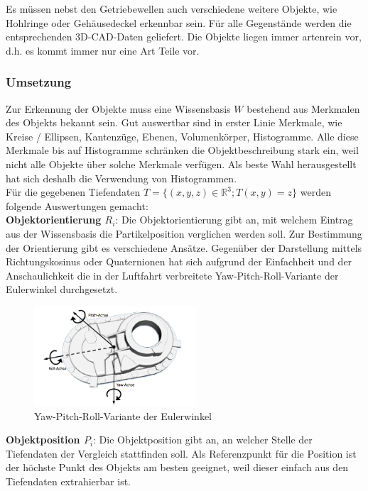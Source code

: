 Es müssen nebst den Getriebewellen auch verschiedene weitere Objekte, wie Hohlringe oder Gehäusedeckel erkennbar sein. Für alle Gegenstände werden die entsprechenden 3D-CAD-Daten geliefert. Die Objekte liegen immer artenrein vor, d.h. es kommt immer nur eine Art Teile vor. \\

\subsubsection{Umsetzung}
Zur Erkennung der Objekte muss eine Wissensbasis $W$ bestehend aus Merkmalen des Objekts bekannt sein. Gut auswertbar sind in erster Linie Merkmale, wie Kreise / Ellipsen, Kantenzüge, Ebenen, Volumenkörper, Histogramme. Alle diese Merkmale bis auf Histogramme schränken die Objektbeschreibung stark ein, weil nicht alle Objekte über solche Merkmale verfügen. Als beste Wahl herausgestellt hat sich deshalb die Verwendung von Histogrammen. \\

Für die gegebenen Tiefendaten $T = \{ (x,y,z) \in \mathbb{R}^3 ; T(x,y)=z\}$ werden folgende Auswertungen gemacht: \\

\textbf{Objektorientierung $R_i$}: Die Objektorientierung gibt an, mit welchem Eintrag aus der Wissensbasis die Partikelposition verglichen werden soll. Zur Bestimmung der Orientierung gibt es verschiedene Ansätze. Gegenüber der Darstellung mittels Richtungskosinus oder Quaternionen hat sich aufgrund der Einfachheit und der Anschaulichkeit die in der Luftfahrt verbreitete Yaw-Pitch-Roll-Variante der Eulerwinkel durchgesetzt.

\begin{figure}[htbp]
	\centering
	\includegraphics[width=6cm]{images/yaw-pitch-roll}
	\caption{Yaw-Pitch-Roll-Variante der Eulerwinkel}
	\label{Fig-Yaw-Pitch-Roll}
\end{figure}

\textbf{Objektposition $P_i$}: Die Objektposition gibt an, an welcher Stelle der Tiefendaten der Vergleich stattfinden soll. Als Referenzpunkt für die Position ist der höchste Punkt des Objekts am besten geeignet, weil dieser einfach aus den Tiefendaten extrahierbar ist. \\

